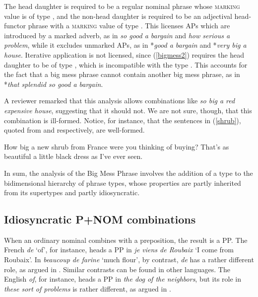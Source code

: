 \documentclass[output=paper
                ,modfonts
                ,nonflat
	        ,collection
	        ,collectionchapter
	        ,collectiontoclongg
 	        ,biblatex
                ,babelshorthands
                ,newtxmath
                ,draftmode
                ,colorlinks, citecolor=brown
]{./langsci/langscibook}
\begin{document}
\noindent
The head daughter is required to be a regular nominal phrase 
whose \textsc{marking} value is of type , and the non-head daughter 
is required to be an adjectival head-functor phrase
with a \textsc{marking} value of type . 
This licenses APs which are introduced by a marked adverb, 
as in \emph{so good a bargain} and \emph{how serious a problem}, 
while it excludes unmarked APs, as in 
*\emph{good a bargain} and *\emph{very big a house}.
Iterative application is not licensed, since (\ref{bigmess2}) requires the 
head daughter to be of type , which is incompatible with the type 
. This accounts for the fact that a big
mess phrase cannot contain another big mess phrase, as in
*\emph{that splendid so good a bargain}.

A reviewer remarked that this analysis allows combinations like 
\emph{so big a red expensive house}, suggesting that it should not. 
We are not sure, though, that this combination is ill-formed.
Notice, for instance, that the sentences in (\ref{shrub}), 
quoted from \citet[116]{Zwicky95} and \citet[42]{Troseth09} respectively, 
are well-formed. 

\begin{exe} 
\ex\label{shrub} 
\begin{xlist} 
\ex  How big a new shrub from France were you thinking of buying? 
\ex  That's as beautiful a little black dress as I've ever seen.  
\end{xlist} 
\end{exe} 

In sum, the analysis of the Big Mess Phrase involves the addition of 
a type to the bidimensional hierarchy of phrase types, whose properties 
are partly inherited from its supertypes and partly idiosyncratic.      


\subsection{Idiosyncratic P+NOM combinations} 
\label{prep}


When an ordinary nominal combines with a preposition, the result is a PP. 
The French \emph{de} `of', for instance, heads a PP in 
\emph{je viens de Roubaix} `I come from Roubaix'. 
In \emph{beaucoup de farine} `much flour', by contrast, \emph{de} has 
a rather different role, as argued in \citet{Abeilleetal04}. 
Similar contrasts can be found in other languages. The English \emph{of}, for instance, 
heads a PP in \emph{the dog of the neighbors}, but its role in \emph{these sort of problems} 
is rather different, as argued in \citet{Maekawa15}.  
\end{document}
